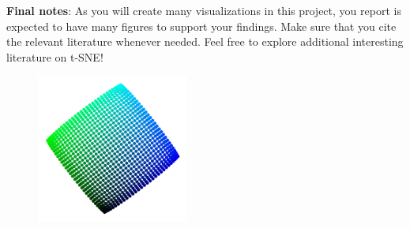 \documentclass[11pt]{article}
\begin{document}
\textbf{Final notes}: As you will create many visualizations in this project, you report is expected to have many figures to support your findings. Make sure that you cite the relevant literature whenever needed. Feel free to explore additional interesting literature on t-SNE!

\begin{figure}[h!]
\centering\includegraphics[width=5cm]{Task-1-t-SNE.png}
\end{figure}

\newpage



\end{document}
